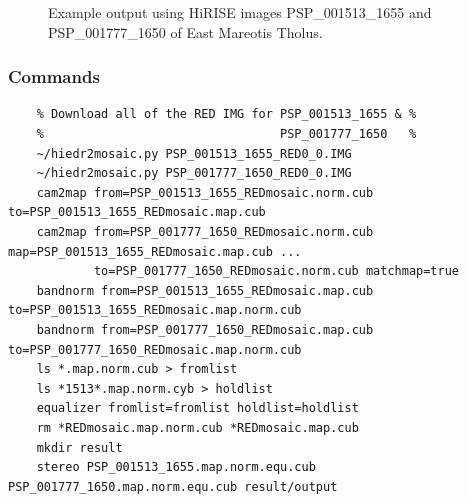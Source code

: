 \begin{figure}[h!]
\centering
  \hfil
\caption{Example output using HiRISE images PSP\_001513\_1655 and
  PSP\_001777\_1650 of East Mareotis Tholus.}
\label{fig:hirise_chills_example}
\end{figure}

\subsubsection*{Commands}

\begin{verbatim}
    % Download all of the RED IMG for PSP_001513_1655 & %
    %                                 PSP_001777_1650   %
    ~/hiedr2mosaic.py PSP_001513_1655_RED0_0.IMG
    ~/hiedr2mosaic.py PSP_001777_1650_RED0_0.IMG
    cam2map from=PSP_001513_1655_REDmosaic.norm.cub to=PSP_001513_1655_REDmosaic.map.cub
    cam2map from=PSP_001777_1650_REDmosaic.norm.cub map=PSP_001513_1655_REDmosaic.map.cub ...
            to=PSP_001777_1650_REDmosaic.norm.cub matchmap=true
    bandnorm from=PSP_001513_1655_REDmosaic.map.cub to=PSP_001513_1655_REDmosaic.map.norm.cub
    bandnorm from=PSP_001777_1650_REDmosaic.map.cub to=PSP_001777_1650_REDmosaic.map.norm.cub
    ls *.map.norm.cub > fromlist
    ls *1513*.map.norm.cyb > holdlist
    equalizer fromlist=fromlist holdlist=holdlist
    rm *REDmosaic.map.norm.cub *REDmosaic.map.cub
    mkdir result
    stereo PSP_001513_1655.map.norm.equ.cub PSP_001777_1650.map.norm.equ.cub result/output
\end{verbatim}

